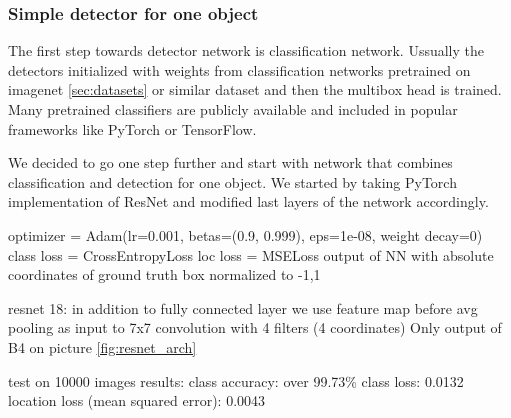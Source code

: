 


\subsubsection{Simple detector for one object}
The first step towards detector network is classification network. Ussually the detectors initialized with weights from classification networks pretrained on imagenet \cref{sec:datasets} or similar dataset and then the multibox head is trained. Many pretrained classifiers are publicly available and included in popular frameworks like PyTorch or TensorFlow.

We decided  to go one step further and start with network that combines classification and detection for one object. We started by taking PyTorch implementation of ResNet and modified last layers of the network accordingly. 


optimizer = Adam(lr=0.001, betas=(0.9, 0.999), eps=1e-08, weight decay=0)
class loss = CrossEntropyLoss
loc loss = MSELoss output of NN with absolute coordinates of ground truth box normalized to -1,1 

resnet 18: in addition to fully connected layer we use feature map before avg pooling as input to 7x7 convolution with 4 filters (4 coordinates) Only output of B4 on picture \cref{fig:resnet_arch} 

test on 10000 images
results: class accuracy: over 99.73\%
class loss: 0.0132
location loss (mean squared error): 0.0043



